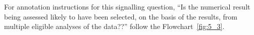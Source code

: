 \documentclass[sn-mathphys,Numbered]{sn-jnl}%
\begin{document}
For annotation instructions for this signalling question, ``Is the numerical result being assessed likely to have been selected, on the basis of the results, from multiple eligible analyses of the data??'' follow the Flowchart~\ref{fig:5_3}.


%
%
%

%
\end{document}
